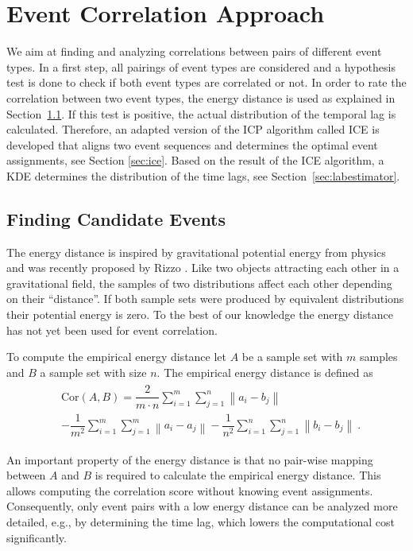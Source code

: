 \documentclass[conference]{IEEEtran}
\theoremstyle{examplestyle}
\begin{document}
\section{Event Correlation Approach}
\label{sec:approach}
We aim at finding and analyzing correlations between pairs of different event types. In a first step, all pairings of event types are considered and a hypothesis test is done to check if both event types are correlated or not. In order to rate the correlation between two event types, the energy distance \cite{Rizzo2016} is used as explained in Section~\ref{sec:energyDistance}. 
If this test is positive, the actual distribution of the temporal lag is calculated. Therefore, an adapted version of the \ac{ICP} algorithm called \ac{ICE} is developed that aligns two event sequences and determines the optimal event assignments, see Section \ref{sec:ice}.
Based on the result of the \ac{ICE} algorithm, a \ac{KDE} determines the distribution of the time lags, see Section~\ref{sec:labestimator}.




\subsection{Finding Candidate Events}
\label{sec:energyDistance}
The energy distance is inspired by gravitational potential energy from physics and was recently proposed by Rizzo \cite{Rizzo2016}. Like two objects attracting each other in a gravitational field, the samples of two distributions affect each other depending on their ``distance''. If both sample sets were produced by equivalent distributions their potential energy is zero. To the best of our knowledge the energy distance has not yet been used for event correlation.

To compute the empirical energy distance let \(A\) be a sample set with \(m\) samples and \(B\) a sample set with size \(n\). The empirical energy distance is defined as
\begin{align}
\begin{split}
	& \text{Cor}(A, B) = \dfrac{2}{m \cdot n} \sum_{i = 1}^m \sum_{j = 1}^n \left\| a_i - b_j \right\| \\
	& - \dfrac{1}{m^2} \sum_{i = 1}^m \sum_{j = 1}^m \left\| a_i - a_j \right\| - \dfrac{1}{n^2} \sum_{i = 1}^n \sum_{j = 1}^n \left\| b_i - b_j \right\| ~.
\end{split}
\end{align}

An important property of the energy distance is that no pair-wise mapping between \(A\) and \(B\) is required to calculate the empirical energy distance. This allows computing the correlation score without knowing event assignments. 
Consequently, only event pairs with a low energy distance can be analyzed more detailed, e.g., by determining the time lag, which lowers the computational cost significantly.
\end{document}
